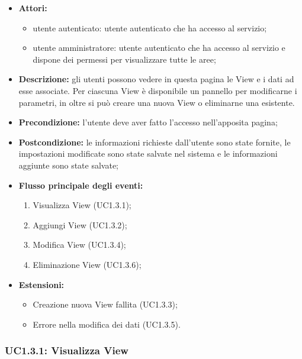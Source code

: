 \begin{itemize}
    \item \textbf{Attori:}
    \begin{itemize}
    	\item utente autenticato: utente autenticato che ha accesso al servizio;
    	\item utente amministratore: utente autenticato che ha accesso al servizio e dispone dei permessi per visualizzare tutte le aree;
	\end{itemize}
	 \item \textbf{Descrizione:} gli utenti possono vedere in questa pagina le View e i dati ad esse associate. Per ciascuna View è disponibile un pannello per modificarne i parametri, in oltre si può creare una nuova View o eliminarne una esistente.
    \item \textbf{Precondizione:} l'utente deve aver fatto l'accesso nell'apposita pagina;
    \item \textbf{Postcondizione:} le informazioni richieste dall'utente sono state fornite, le impostazioni modificate sono state salvate nel sistema e le informazioni aggiunte sono state salvate;
    \item \textbf{Flusso principale degli eventi:}
    	\begin{enumerate}
    		\item Visualizza View (UC1.3.1);
    		\item Aggiungi View (UC1.3.2);
    		\item Modifica View (UC1.3.4);
    		\item Eliminazione View (UC1.3.6);
    	\end{enumerate}
    \item \textbf{Estensioni:}
    \begin{itemize}
    	\item Creazione nuova View fallita (UC1.3.3);
    	\item Errore nella modifica dei dati (UC1.3.5).
	\end{itemize}
\end{itemize}

\subsubsection{UC1.3.1: Visualizza View}

